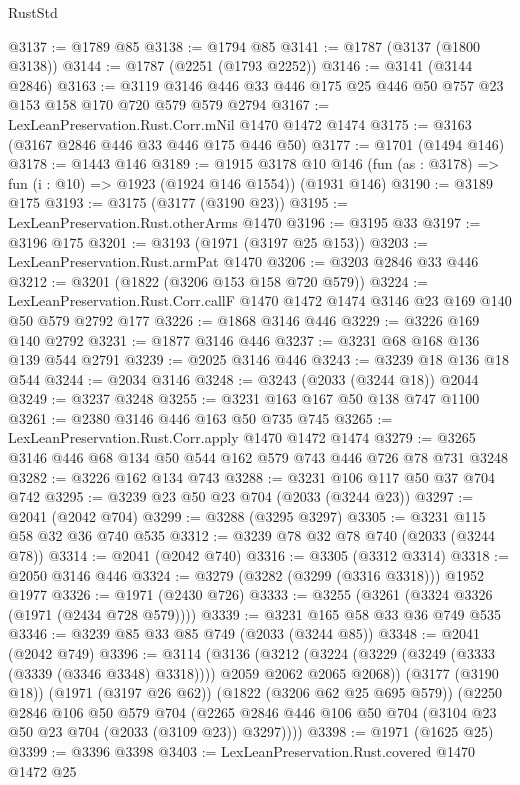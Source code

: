 \begin{lexlean}{RustStd}
\begin{coremodule}
{\begin{coremodule}
{{{{{{{{{{{{{@3137 := @1789 @85
@3138 := @1794 @85
@3141 := @1787 (@3137 (@1800 @3138))
@3144 := @1787 (@2251 (@1793 @2252))
@3146 := @3141 (@3144 @2846)
@3163 := @3119 @3146 @446 @33 @446 @175 @25 @446 @50 @757 @23 @153 @158 @170 @720 @579 @579 @2794
@3167 := LexLeanPreservation.Rust.Corr.mNil @1470 @1472 @1474
@3175 := @3163 (@3167 @2846 @446 @33 @446 @175 @446 @50)
@3177 := @1701 (@1494 @146)
@3178 := @1443 @146
@3189 := @1915
    @3178
    @10
    @146
    (fun (as : @3178) => fun (i : @10) => @1923 (@1924 @146 @1554))
    (@1931 @146)
@3190 := @3189 @175
@3193 := @3175 (@3177 (@3190 @23))
@3195 := LexLeanPreservation.Rust.otherArms @1470
@3196 := @3195 @33
@3197 := @3196 @175
@3201 := @3193 (@1971 (@3197 @25 @153))
@3203 := LexLeanPreservation.Rust.armPat @1470
@3206 := @3203 @2846 @33 @446
@3212 := @3201 (@1822 (@3206 @153 @158 @720 @579))
@3224 := LexLeanPreservation.Rust.Corr.callF
    @1470
    @1472
    @1474
    @3146
    @23
    @169
    @140
    @50
    @579
    @2792
    @177
@3226 := @1868 @3146 @446
@3229 := @3226 @169 @140 @2792
@3231 := @1877 @3146 @446
@3237 := @3231 @68 @168 @136 @139 @544 @2791
@3239 := @2025 @3146 @446
@3243 := @3239 @18 @136 @18 @544
@3244 := @2034 @3146
@3248 := @3243 (@2033 (@3244 @18)) @2044
@3249 := @3237 @3248
@3255 := @3231 @163 @167 @50 @138 @747 @1100
@3261 := @2380 @3146 @446 @163 @50 @735 @745
@3265 := LexLeanPreservation.Rust.Corr.apply @1470 @1472 @1474
@3279 := @3265 @3146 @446 @68 @134 @50 @544 @162 @579 @743 @446 @726 @78 @731 @3248
@3282 := @3226 @162 @134 @743
@3288 := @3231 @106 @117 @50 @37 @704 @742
@3295 := @3239 @23 @50 @23 @704 (@2033 (@3244 @23))
@3297 := @2041 (@2042 @704)
@3299 := @3288 (@3295 @3297)
@3305 := @3231 @115 @58 @32 @36 @740 @535
@3312 := @3239 @78 @32 @78 @740 (@2033 (@3244 @78))
@3314 := @2041 (@2042 @740)
@3316 := @3305 (@3312 @3314)
@3318 := @2050 @3146 @446
@3324 := @3279 (@3282 (@3299 (@3316 @3318))) @1952 @1977
@3326 := @1971 (@2430 @726)
@3333 := @3255 (@3261 (@3324 @3326 (@1971 (@2434 @728 @579))))
@3339 := @3231 @165 @58 @33 @36 @749 @535
@3346 := @3239 @85 @33 @85 @749 (@2033 (@3244 @85))
@3348 := @2041 (@2042 @749)
@3396 := @3114
    (@3136
      (@3212 (@3224 (@3229 (@3249 (@3333 (@3339 (@3346 @3348) @3318)))) @2059 @2062 @2065 @2068))
      (@3177 (@3190 @18))
      (@1971 (@3197 @26 @62))
      (@1822 (@3206 @62 @25 @695 @579))
      (@2250
        @2846
        @106
        @50
        @579
        @704
        (@2265 @2846 @446 @106 @50 @704 (@3104 @23 @50 @23 @704 (@2033 (@3109 @23)) @3297))))
@3398 := @1971 (@1625 @25)
@3399 := @3396 @3398
@3403 := LexLeanPreservation.Rust.covered @1470 @1472 @25
}}}}}}}}}}}}}
\end{coremodule}}
\end{coremodule}
\end{lexlean}
